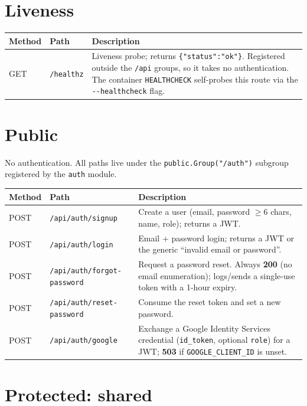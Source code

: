 \section{Liveness}

\begin{xltabular}{\linewidth}{l >{\ttfamily\small\raggedright\arraybackslash}p{5.6cm} X}
  \toprule
  Method & Path & Description \\
  \midrule
  GET & \texttt{/healthz} & Liveness probe; returns \texttt{\{"status":"ok"\}}. Registered outside the \texttt{/api} groups, so it takes no authentication. The container \texttt{HEALTHCHECK} self-probes this route via the \texttt{-{}-healthcheck} flag. \\
  \bottomrule
\end{xltabular}

\section{Public}

No authentication. All paths live under the \texttt{public.Group("/auth")} subgroup registered by the \texttt{auth} module.

\begin{xltabular}{\linewidth}{l >{\ttfamily\small\raggedright\arraybackslash}p{5.6cm} X}
  \toprule
  Method & Path & Description \\
  \midrule
  POST & \texttt{/api/auth/signup}          & Create a user (email, password $\geq$6 chars, name, role); returns a JWT. \\
  POST & \texttt{/api/auth/login}           & Email + password login; returns a JWT or the generic ``invalid email or password''. \\
  POST & \texttt{/api/auth/forgot-password} & Request a password reset. Always \textbf{200} (no email enumeration); logs/sends a single-use token with a 1-hour expiry. \\
  POST & \texttt{/api/auth/reset-password}  & Consume the reset token and set a new password. \\
  POST & \texttt{/api/auth/google}          & Exchange a Google Identity Services credential (\texttt{id\_token}, optional \texttt{role}) for a JWT; \textbf{503} if \texttt{GOOGLE\_CLIENT\_ID} is unset. \\
  \bottomrule
\end{xltabular}

\section{Protected: shared}

